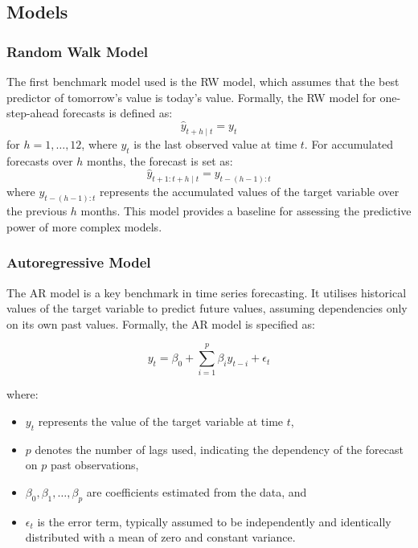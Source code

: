 \subsection{Models} \label{sec:methods_models}

\subsubsection{Random Walk Model}

The first benchmark model used is the RW model, which assumes that the best predictor of tomorrow's value is today's value. Formally, the RW model for one-step-ahead forecasts is defined as:
\begin{equation}
    \widehat{y}_{t+h \mid t} = y_t
\end{equation}
for $h=1, \ldots, 12$, where $y_t$ is the last observed value at time $t$. For accumulated forecasts over $h$ months, the forecast is set as:
\begin{equation}
    \widehat{y}_{t+1:t+h \mid t} = y_{t-(h-1):t}
\end{equation}
where $y_{t-(h-1):t}$ represents the accumulated values of the target variable over the previous $h$ months. This model provides a baseline for assessing the predictive power of more complex models.

\subsubsection{Autoregressive Model}

The AR model is a key benchmark in time series forecasting. It utilises historical values of the target variable to predict future values, assuming dependencies only on its own past values. Formally, the AR model is specified as:

\begin{equation}
    y_t = \beta_0 + \sum_{i=1}^{p} \beta_i y_{t-i} + \epsilon_t
\end{equation}

where:
\begin{itemize}
    \item $y_t$ represents the value of the target variable at time $t$,
    \item $p$ denotes the number of lags used, indicating the dependency of the forecast on $p$ past observations,
    \item $\beta_0, \beta_1, \ldots, \beta_p$ are coefficients estimated from the data, and
    \item $\epsilon_t$ is the error term, typically assumed to be independently and identically distributed with a mean of zero and constant variance.
\end{itemize}

